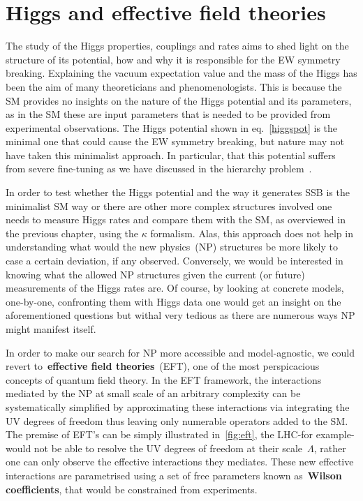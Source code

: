 \chapter{Higgs and effective field theories }\label{chap:HiggsEFT}
\par The study of the Higgs properties, couplings and rates aims to shed light on the structure of its potential, how and why it is responsible for the EW symmetry breaking. Explaining the vacuum expectation value and the mass of the Higgs has been the aim of many theoreticians and phenomenologists. This is because the SM provides no insights on the nature of the Higgs potential and its parameters, as  in the SM these are  input parameters that is needed to be provided from experimental observations. The Higgs potential shown in eq.~\eqref{higgspot} is the minimal one that could cause the EW symmetry breaking, but nature may not have taken this minimalist approach. In particular, that this potential suffers from severe fine-tuning as we have discussed in the hierarchy problem~.
\par  In order to test whether the Higgs potential and the way it generates SSB is the minimalist SM way or there are other more complex structures involved one needs to measure Higgs rates and compare them with the SM, as overviewed in the previous chapter, using the $\kappa$ formalism. Alas, this approach does not help in understanding what would the new physics~(NP) structures be more likely to case a certain deviation, if any observed. Conversely, we would be interested in knowing what the allowed NP structures given the current (or future) measurements of the Higgs rates are.  Of course, by looking at concrete models, one-by-one,  confronting them with Higgs data one would get an insight on the aforementioned questions but withal very tedious as there are numerous ways NP might manifest itself. 
\par In order to make our search for NP more accessible and model-agnostic, we could revert to~\textbf{effective field theories}~(EFT), one of the most perspicacious concepts of quantum field theory. In the EFT framework, the interactions mediated by the NP at small scale of an arbitrary complexity can be systematically simplified by approximating these interactions via integrating the UV degrees of freedom thus leaving only numerable operators added to the SM. The premise of EFT's can be simply illustrated in~\autoref{fig:eft},   the LHC-for example- would not be able to resolve the UV degrees of freedom at their scale~$\Lambda$, rather one can only observe the effective interactions they mediates. These new effective interactions are parametrised using a set of free parameters known as~\textbf{Wilson coefficients}, that would be constrained from experiments. 
